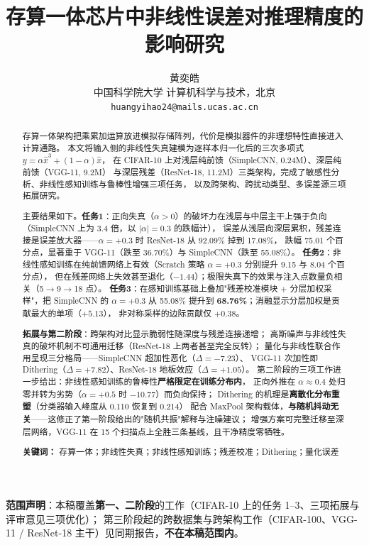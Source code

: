 \documentclass[11pt,a4paper]{ctexart}
\title{\bfseries 存算一体芯片中非线性误差对推理精度的影响研究}
\author{黄奕皓\\[2pt] \small 中国科学院大学 计算机科学与技术，北京\\ \small \texttt{huangyihao24@mails.ucas.ac.cn}}
\date{}
\begin{document}
\maketitle

\vspace{-1.2em}
\begin{abstract}
\noindent
存算一体架构把乘累加运算放进模拟存储阵列，代价是模拟器件的非理想特性直接进入计算通路。
本文将输入侧的非线性失真建模为逐样本归一化后的三次多项式 $y=\alpha\hat{x}^3+(1-\alpha)\hat{x}$，
在 CIFAR-10 上对浅层纯前馈（SimpleCNN, 0.24M）、深层纯前馈（VGG-11, 9.2M）
与深层残差（ResNet-18, 11.2M）三类架构，完成了敏感性分析、非线性感知训练与鲁棒性增强三项任务，
以及跨架构、跨扰动类型、多误差源三项拓展研究。

主要结果如下。\textbf{任务1}：正向失真（$\alpha>0$）的破坏力在浅层与中层主干上强于负向
（SimpleCNN 上为 3.4 倍，以 $|\alpha|=0.3$ 的跌幅计），
误差从浅层向深层累积，残差连接是误差放大器——$\alpha=+0.3$ 时 ResNet-18 从 92.09\% 掉到 17.08\%，
跌幅 75.01 个百分点，显著重于 VGG-11（跌至 36.70\%）与 SimpleCNN（跌至 55.08\%）。
\textbf{任务2}：非线性感知训练在纯前馈网络上有效（Scratch 策略 $\alpha=+0.3$ 分别提升 9.15 与 8.04 个百分点），
但在残差网络上失效甚至退化（$-1.44$）；极限失真下的效果与注入点数量负相关（5$\to$9$\to$18 点）。
\textbf{任务3}：在感知训练基础上叠加"残差校准模块 $+$ 分层加权采样"，把 SimpleCNN 的 $\alpha=+0.3$
从 55.08\% 提升到 \textbf{68.76\%}；消融显示分层加权是贡献最大的单项（$+5.13$），
非对称采样的边际贡献仅 $+0.38$。

\textbf{拓展与第二阶段}：跨架构对比显示脆弱性随深度与残差连接递增；
高斯噪声与非线性失真的破坏机制不可通用迁移（ResNet-18 上两者甚至完全反转）；
量化与非线性联合作用呈现三分格局——SimpleCNN 超加性恶化（$\Delta=-7.23$）、
VGG-11 次加性即 Dithering（$\Delta=+7.82$）、ResNet-18 地板效应（$\Delta=+1.05$）。
第二阶段的三项工作进一步给出：非线性感知训练的鲁棒性\textbf{严格限定在训练分布内}，
正向外推在 $\alpha\approx0.4$ 处归零并转为劣势（$\alpha=+0.5$ 时 $-10.77$）而负向保持；
Dithering 的机理是\textbf{离散化分布重塑}（分类器输入峰度从 0.110 恢复到 0.214）
配合 MaxPool 架构载体，\textbf{与随机抖动无关}——这修正了第一阶段给出的"随机共振"解释与注噪建议；
增强方案可完整迁移至深层网络，VGG-11 在 15 个扫描点上全胜三条基线，且干净精度零牺牲。

\vspace{0.6em}
\noindent\textbf{关键词：} 存算一体；非线性失真；非线性感知训练；残差校准；Dithering；量化误差
\end{abstract}

\vspace{0.4em}
\noindent\textbf{范围声明}：本稿覆盖\textbf{第一、二阶段}的工作（CIFAR-10 上的任务 1--3、三项拓展与评审意见三项优化）；
第三阶段起的跨数据集与跨架构工作（CIFAR-100、VGG-11 / ResNet-18 主干）见同期报告，\textbf{不在本稿范围内}。
\end{document}
